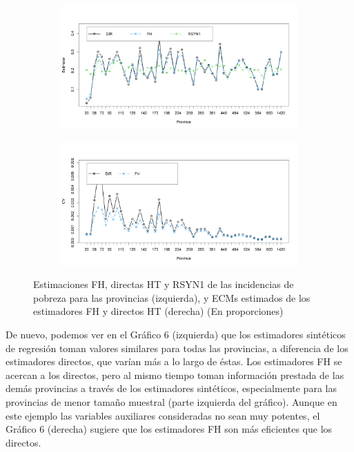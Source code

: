 \documentclass[12pt,spanish]{article}
\begin{document}
\begin{figure}[H]
    \centering
    \begin{subfigure}[b]{0.45\textwidth}
        \centering
        \includegraphics[width=\textwidth]{estimaciones directas y FH y MSE.png}
        \label{fig:imagen1}
    \end{subfigure}
    \begin{subfigure}[b]{0.45\textwidth}
        \centering
        \includegraphics[width=\textwidth]{estimaciones directas y FH.png}
        \label{fig:imagen2}
    \end{subfigure}
    \caption{Estimaciones FH, directas HT y RSYN1 de las incidencias de pobreza para las provincias (izquierda), y ECMs estimados de los estimadores FH y directos HT (derecha) 
    (En proporciones)}
    \label{fig:imagenes_paralelas}
\end{figure}

De nuevo, podemos ver en el Gráfico 6 (izquierda) que los estimadores sintéticos de regresión toman valores similares para todas las provincias, a diferencia de los estimadores directos, que varían más a lo largo de éstas. Los estimadores FH se acercan a los directos, pero al mismo tiempo toman información prestada de las demás provincias a través de los estimadores sintéticos, especialmente para las provincias de menor tamaño muestral (parte izquierda del gráfico). Aunque en este ejemplo las variables auxiliares 
consideradas no sean muy potentes, el Gráfico 6 (derecha) sugiere que los estimadores FH son más eficientes que los directos. 
\end{document}
